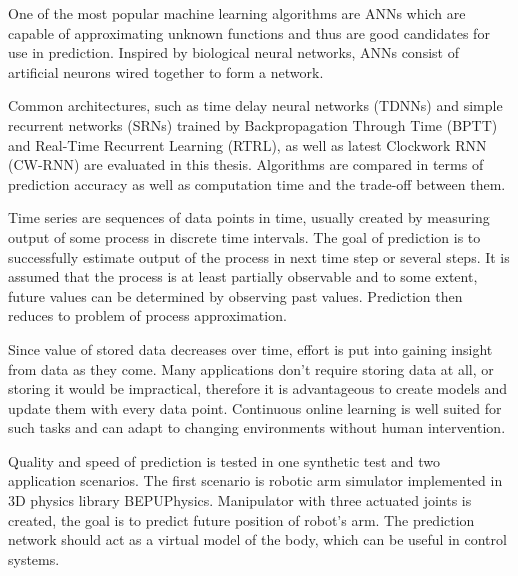 \documentclass[12pt,oneside]{fithesis2}
\begin{document}
\par %
One of the most popular machine learning algorithms are ANNs which are capable of approximating unknown functions and thus are good candidates for use in prediction. Inspired by biological neural networks, ANNs consist of artificial neurons wired together to form a network.
\par %
Common architectures, such as time delay neural networks (TDNNs) and simple recurrent networks (SRNs) trained by Backpropagation Through Time (BPTT) and Real-Time Recurrent Learning (RTRL), as well as latest Clockwork RNN (CW-RNN) are evaluated in this thesis. Algorithms are compared in terms of prediction accuracy as well as computation time and the trade-off between them.
\par %
Time series are sequences of data points in time, usually created by measuring output of some process in discrete time intervals. The goal of prediction is to successfully estimate output of the process in next time step or several steps. It is assumed that the process is at least partially observable and to some extent, future values can be determined by observing past values. Prediction then reduces to problem of process approximation.
\par %
Since value of stored data decreases over time, effort is put into gaining insight from data as they come. Many applications don't require storing data at all, or storing it would be impractical, therefore it is advantageous to create models and update them with every data point. Continuous online learning is well suited for such tasks and can adapt to changing environments without human intervention.
\par %
Quality and speed of prediction is tested in one synthetic test and two application scenarios. The first scenario is robotic arm simulator implemented in 3D physics library BEPUPhysics. Manipulator with three actuated joints is created, the goal is to predict future position of robot's arm. The prediction network should act as a virtual model of the body, which can be useful in control systems.

\end{document}
